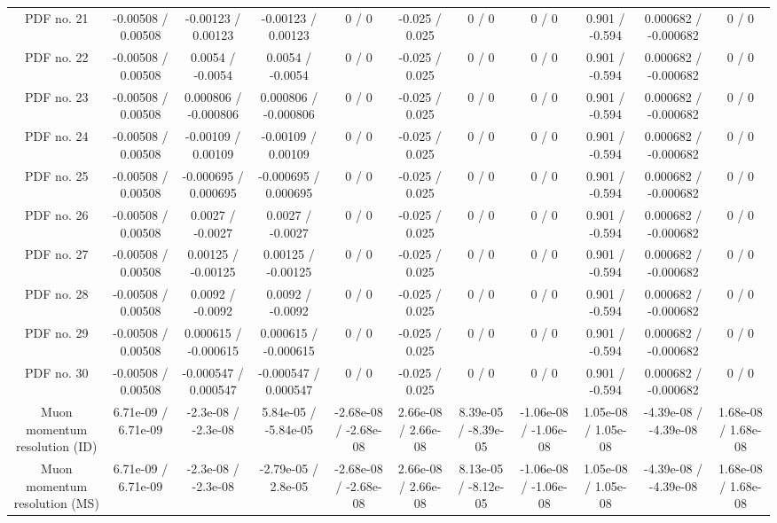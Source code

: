 \begin{table}[htbp]
\begin{center}
\begin{tabular}{|c|c|c|c|c|c|c|c|c|c|c|}
  PDF no. 21 & -0.00508 / 0.00508 & -0.00123 / 0.00123 & -0.00123 / 0.00123 & 0 / 0 & -0.025 / 0.025 & 0 / 0 & 0 / 0 & 0.901 / -0.594 & 0.000682 / -0.000682 & 0 / 0 \\ 
  PDF no. 22 & -0.00508 / 0.00508 & 0.0054 / -0.0054 & 0.0054 / -0.0054 & 0 / 0 & -0.025 / 0.025 & 0 / 0 & 0 / 0 & 0.901 / -0.594 & 0.000682 / -0.000682 & 0 / 0 \\ 
  PDF no. 23 & -0.00508 / 0.00508 & 0.000806 / -0.000806 & 0.000806 / -0.000806 & 0 / 0 & -0.025 / 0.025 & 0 / 0 & 0 / 0 & 0.901 / -0.594 & 0.000682 / -0.000682 & 0 / 0 \\ 
  PDF no. 24 & -0.00508 / 0.00508 & -0.00109 / 0.00109 & -0.00109 / 0.00109 & 0 / 0 & -0.025 / 0.025 & 0 / 0 & 0 / 0 & 0.901 / -0.594 & 0.000682 / -0.000682 & 0 / 0 \\ 
  PDF no. 25 & -0.00508 / 0.00508 & -0.000695 / 0.000695 & -0.000695 / 0.000695 & 0 / 0 & -0.025 / 0.025 & 0 / 0 & 0 / 0 & 0.901 / -0.594 & 0.000682 / -0.000682 & 0 / 0 \\ 
  PDF no. 26 & -0.00508 / 0.00508 & 0.0027 / -0.0027 & 0.0027 / -0.0027 & 0 / 0 & -0.025 / 0.025 & 0 / 0 & 0 / 0 & 0.901 / -0.594 & 0.000682 / -0.000682 & 0 / 0 \\ 
  PDF no. 27 & -0.00508 / 0.00508 & 0.00125 / -0.00125 & 0.00125 / -0.00125 & 0 / 0 & -0.025 / 0.025 & 0 / 0 & 0 / 0 & 0.901 / -0.594 & 0.000682 / -0.000682 & 0 / 0 \\ 
  PDF no. 28 & -0.00508 / 0.00508 & 0.0092 / -0.0092 & 0.0092 / -0.0092 & 0 / 0 & -0.025 / 0.025 & 0 / 0 & 0 / 0 & 0.901 / -0.594 & 0.000682 / -0.000682 & 0 / 0 \\ 
  PDF no. 29 & -0.00508 / 0.00508 & 0.000615 / -0.000615 & 0.000615 / -0.000615 & 0 / 0 & -0.025 / 0.025 & 0 / 0 & 0 / 0 & 0.901 / -0.594 & 0.000682 / -0.000682 & 0 / 0 \\ 
  PDF no. 30 & -0.00508 / 0.00508 & -0.000547 / 0.000547 & -0.000547 / 0.000547 & 0 / 0 & -0.025 / 0.025 & 0 / 0 & 0 / 0 & 0.901 / -0.594 & 0.000682 / -0.000682 & 0 / 0 \\ 
  Muon momentum resolution (ID) & 6.71e-09 / 6.71e-09 & -2.3e-08 / -2.3e-08 & 5.84e-05 / -5.84e-05 & -2.68e-08 / -2.68e-08 & 2.66e-08 / 2.66e-08 & 8.39e-05 / -8.39e-05 & -1.06e-08 / -1.06e-08 & 1.05e-08 / 1.05e-08 & -4.39e-08 / -4.39e-08 & 1.68e-08 / 1.68e-08 \\ 
  Muon momentum resolution (MS) & 6.71e-09 / 6.71e-09 & -2.3e-08 / -2.3e-08 & -2.79e-05 / 2.8e-05 & -2.68e-08 / -2.68e-08 & 2.66e-08 / 2.66e-08 & 8.13e-05 / -8.12e-05 & -1.06e-08 / -1.06e-08 & 1.05e-08 / 1.05e-08 & -4.39e-08 / -4.39e-08 & 1.68e-08 / 1.68e-08 \\ 

\end{tabular}
\end{center}
\end{table}
